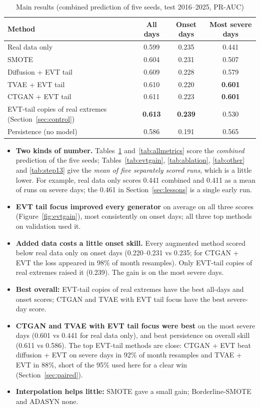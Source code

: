 \documentclass[12pt,a4paper]{report}
\begin{document}
\begin{table}[H]
\centering
\caption{Main results (combined prediction of five seeds, test 2016--2025, PR-AUC)}
\label{tab:rank}
\small
\begin{tabular}{|l|c|c|c|}
\hline
\textbf{Method} & \textbf{All days} & \textbf{Onset days} & \textbf{Most severe days}\\ \hline
Real data only & 0.599 & 0.235 & 0.441 \\ \hline
SMOTE & 0.604 & 0.231 & 0.507 \\ \hline
\rowcolor{rowhl} Diffusion + EVT tail & 0.609 & 0.228 & 0.579 \\
\rowcolor{rowhl} TVAE + EVT tail & 0.610 & 0.220 & \textbf{0.601} \\
\rowcolor{rowhl} CTGAN + EVT tail & 0.611 & 0.223 & \textbf{0.601} \\ \hline
\rowcolor{rowhl2} EVT-tail copies of real extremes (Section~\ref{sec:control}) & \textbf{0.613} & \textbf{0.239} & 0.530 \\ \hline
Persistence (no model) & 0.586 & 0.191 & 0.565 \\ \hline
\end{tabular}
\end{table}

\begin{itemize}
  \item \textbf{Two kinds of number.} Tables~\ref{tab:rank} and~\ref{tab:allmetrics} score the \emph{combined}
        prediction of the five seeds; Tables~\ref{tab:evtgain}, \ref{tab:ablation}, \ref{tab:other} and \ref{tab:step13}
        give the \emph{mean of five separately scored runs}, which is a little lower. For example, real data only
        scores 0.441 combined and 0.411 as a mean of runs on severe days; the 0.461 in Section~\ref{sec:lessons} is a
        single early run.
  \item \textbf{EVT tail focus improved every generator} on average on all three scores (Figure~\ref{fig:evtgain}),
        most consistently on onset days; all three top methods on validation used it.
  \item \textbf{Added data costs a little onset skill.} Every augmented method scored below real data only on onset
        days (0.220--0.231 vs 0.235; for CTGAN + EVT the loss appeared in 98\% of month resamples). Only EVT-tail
        copies of real extremes raised it (0.239). The gain is on the most severe days.
  \item \textbf{Best overall:} EVT-tail copies of real extremes have the best all-days and onset scores; CTGAN and
        TVAE with EVT tail focus have the best severe-day score.
  \item \textbf{CTGAN and TVAE with EVT tail focus were best} on the most severe days (0.601 vs 0.441 for real data
        only), and beat persistence on overall skill (0.611 vs 0.586). The top EVT-tail methods are close: CTGAN + EVT beat
        diffusion + EVT on severe days in 92\% of month resamples and TVAE + EVT in 88\%, short of the 95\% used here
        for a clear win (Section~\ref{sec:paired}).
  \item \textbf{Interpolation helps little:} SMOTE gave a small gain; Borderline-SMOTE and ADASYN none.
\end{itemize}
\end{document}
